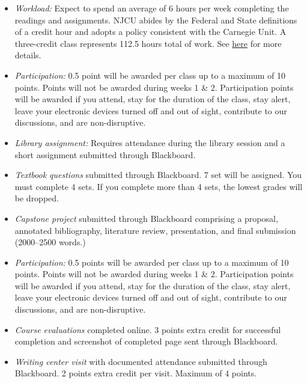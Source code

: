 \documentclass[article,oneside]{memoir}
\begin{document}
\begin{itemize}
\item \textit{Workload:} Expect to spend an average of 6 hours per week completing the readings and assignments. NJCU abides by the Federal and State definitions of a credit hour and adopts a policy consistent with the Carnegie Unit. A three-credit class represents 112.5 hours total of work. See \href{http://scottoconnor.org/resources/Credit.pdf}{here} for more details.


\item \textit{Participation:}  0.5 point will be awarded per class up to a maximum of 10 points. Points will not be awarded during weeks 1 \& 2. Participation points will be awarded if you attend, stay for the duration of the class, stay alert, leave your electronic devices turned off and out of sight, contribute to our discussions, and are non-disruptive. 

\item \textit{Library assignment:} Requires attendance during the library session and a short assignment submitted through Blackboard.

\item \textit{Textbook questions} submitted through Blackboard. 7 set will be assigned. You must complete 4 sets. If you complete more than 4 sets, the lowest grades will be dropped. 




 
\item \textit{Capstone project} submitted through Blackboard comprising a proposal, annotated bibliography, literature review, presentation, and final submission (2000--2500 words.)

\item \textit{Participation:} 0.5 points will be awarded per class up to a maximum of 10 points. Points will not be awarded during weeks 1 \& 2. Participation points will be awarded if you attend, stay for the duration of the class, stay alert, leave your electronic devices turned off and out of sight, contribute to our discussions, and are non-disruptive.

\item \textit{Course evaluations} completed online. 3 points extra credit for successful completion and screenshot of completed page sent through Blackboard. 

\item \textit{Writing center visit} with documented attendance submitted through Blackboard. 2 points extra credit per visit. Maximum of 4 points.  



\end{itemize}
\end{document}

